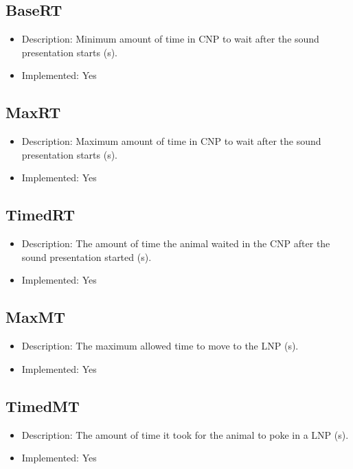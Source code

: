 \subsection*{BaseRT}
\begin{itemize}
	\item Description: Minimum amount of time in CNP to wait after the sound presentation starts (s).
	\item Implemented: Yes
\end{itemize}

\subsection*{MaxRT}
\begin{itemize}
	\item Description: Maximum amount of time in CNP to wait after the sound presentation starts (s).
	\item Implemented: Yes
\end{itemize}

\subsection*{TimedRT}
\begin{itemize}
	\item Description: The amount of time the animal waited in the CNP after the sound presentation started (s).
	\item Implemented: Yes
\end{itemize}

\subsection*{MaxMT}
\begin{itemize}
	\item Description: The maximum allowed time to move to the LNP (s).
	\item Implemented: Yes
\end{itemize}

\subsection*{TimedMT}
\begin{itemize}
	\item Description: The amount of time it took for the animal to poke in a LNP (s).
	\item Implemented: Yes
\end{itemize}

